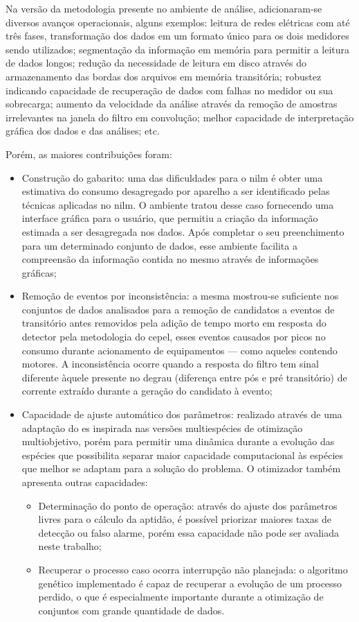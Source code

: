 Na versão da metodologia presente no ambiente de análise,
adicionaram-se diversos avanços operacionais, alguns exemplos: 
leitura de redes elétricas com até três fases, transformação dos dados
em um formato único para os dois medidores sendo utilizados;
segmentação da informação em memória para permitir a leitura de dados
longos; redução da necessidade de leitura em disco através do
armazenamento das bordas dos arquivos em memória transitória;
robustez indicando capacidade de recuperação de dados com falhas no
medidor ou sua sobrecarga; aumento da velocidade da análise através da
remoção de amostras irrelevantes na janela do filtro em convolução;
melhor capacidade de interpretação gráfica dos dados e das análises; etc.

Porém, as maiores contribuições foram: 

\begin{itemize}
\item Construção do gabarito: uma das dificuldades para o \acs{nilm} é
obter uma estimativa do consumo desagregado por aparelho a ser
identificado pelas técnicas aplicadas no \acs{nilm}. O ambiente tratou
desse caso fornecendo uma interface gráfica para o usuário, que
permitiu a criação da informação estimada a ser desagregada nos dados.
Após completar o seu preenchimento para um determinado conjunto de
dados, esse ambiente facilita a compreensão da informação contida no
mesmo através de informações gráficas;
\item Remoção de eventos por inconsistência: a mesma mostrou-se
suficiente nos conjuntos de dados analisados para a remoção de
candidatos a eventos de transitório antes removidos pela adição de
tempo morto em resposta do detector pela metodologia do \acs{cepel},
esses eventos causados por picos no consumo durante acionamento de
equipamentos --- como aqueles contendo motores. A inconsistência
ocorre quando a resposta do filtro tem sinal diferente àquele presente
no degrau (diferença entre pós e pré transitório) de corrente extraído
durante a geração do candidato à evento;
\item Capacidade de ajuste automático dos parâmetros: realizado
através de uma adaptação do \acl{es} inspirada nas versões
multiespécies de otimização multiobjetivo, porém para permitir uma
dinâmica durante a evolução das espécies que possibilita separar
maior capacidade computacional às espécies que melhor se adaptam para
a solução do problema. O otimizador também apresenta outras capacidades:
\begin{itemize}
\item Determinação do ponto de operação: através do ajuste dos
parâmetros livres para o cálculo da aptidão, é possível priorizar
maiores taxas de detecção ou falso alarme, porém essa capacidade não
pode ser avaliada neste trabalho; 
\item Recuperar o processo caso ocorra interrupção não planejada: o
algoritmo genético implementado é capaz de recuperar a evolução de um
processo perdido, o que é especialmente importante durante a
otimização de conjuntos com grande quantidade de dados.
\end{itemize}
\end{itemize}

